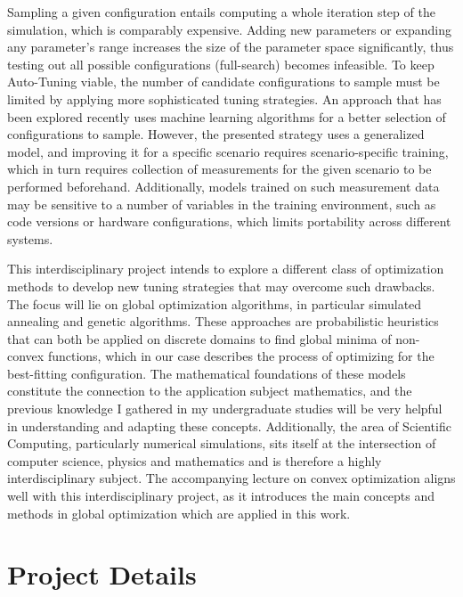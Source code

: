 \documentclass[11pt,parskip=full+]{scrartcl}
\begin{document}
Sampling a given configuration entails computing a whole iteration step of the simulation, which is comparably expensive. Adding new parameters or expanding any parameter's range increases the size of the parameter space significantly, thus testing out all possible configurations (full-search) becomes infeasible. To keep Auto-Tuning viable, the number of candidate configurations to sample must be limited by applying more sophisticated tuning strategies. An approach that has been explored recently uses machine learning algorithms for a better selection of configurations to sample. However, the presented strategy uses a generalized model, and improving it for a specific scenario requires scenario-specific training, which in turn requires collection of measurements for the given scenario to be performed beforehand. Additionally, models trained on such measurement data may be sensitive to a number of variables in the training environment, such as code versions or hardware configurations, which limits portability across different systems. \cite{Metscher2025}

This interdisciplinary project intends to explore a different class of optimization methods to develop new tuning strategies that may overcome such drawbacks. The focus will lie on global optimization algorithms, in particular simulated annealing and genetic algorithms. These approaches are probabilistic heuristics that can both be applied on discrete domains to find global minima of non-convex functions, which in our case describes the process of optimizing for the best-fitting configuration. The mathematical foundations of these models constitute the connection to the application subject mathematics, and the previous knowledge I gathered in my undergraduate studies will be very helpful in understanding and adapting these concepts. Additionally, the area of Scientific Computing, particularly numerical simulations, sits itself at the intersection of computer science, physics and mathematics and is therefore a highly interdisciplinary subject. The accompanying lecture on convex optimization aligns well with this interdisciplinary project, as it introduces the main concepts and methods in global optimization which are applied in this work.


\section*{Project Details}
\vspace*{-1em}
\end{document}

